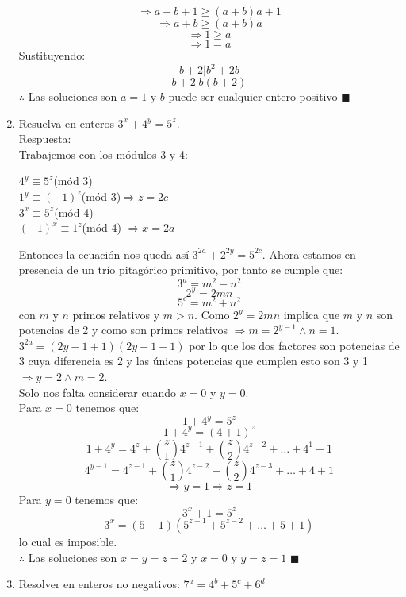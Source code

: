 \documentclass{book}
\begin{document}
\begin{enumerate}
        $$\Rightarrow a + b + 1 \geq (a + b)a + 1$$
        $$\Rightarrow a + b \geq (a + b)a$$
        $$\Rightarrow 1 \geq a$$
        $$\Rightarrow 1 = a $$
        Sustituyendo:
        $$b + 2| b^2 + 2b$$
        $$ b + 2 |b(b + 2)$$
        $\therefore$ Las soluciones son $a = 1$ y $b$ puede ser cualquier entero positivo $\blacksquare$\\
        \item Resuelva en enteros $3^x+4^y=5^z$.\\
        Respuesta:\\
        Trabajemos con los módulos 3 y 4:
        \begin{center}
            $4^y \equiv 5^z$(mód 3) \\
            $1^y \equiv (-1)^z$(mód 3)$ \Rightarrow z= 2c$\\
            $ 3^x \equiv 5^z$(mód 4)\\
            $ (-1)^x \equiv 1^z$(mód 4) $\Rightarrow x= 2a$\\
        \end{center}
        Entonces la ecuación nos queda así $3^{2a} + 2^{2y} = 5^{2c} $. Ahora estamos en presencia de un trío pitagórico primitivo, por tanto se cumple que:
        $$3^a = m^2 - n^2$$
        $$2^y = 2mn$$
        $$5^c = m^2 + n^2$$
        con $m$ y $n$ primos relativos y $m > n$.
        Como $2^y = 2mn$ implica que $m$ y $n$ son potencias de 2 y como son primos relativos $\Rightarrow m= 2^{y-1} \wedge n= 1$. \\
        $3^{2a} = (2y-1 + 1)(2y-1 - 1)$ por lo que los dos factores son potencias de 3 cuya diferencia es 2 y las únicas potencias que cumplen esto son 3 y 1 $\Rightarrow y= 2\wedge m= 2$.\\
        Solo nos falta considerar cuando $x=0$ y $y=0$.\\
        Para $x=0$ tenemos que:
        $$1+4^y=5^z$$
        $$1+4^y={(4+1)}^z$$
        $$1+4^y=4^z+{z\choose 1}4^{z-1}+ {z\choose 2}4^{z-2}+\ldots+4^1+1$$
        $$4^{y-1}=4^{z-1}+{z\choose 1}4^{z-2}+ {z\choose 2}4^{z-3}+\ldots+4+1$$
        $$\Rightarrow y=1\Rightarrow z=1$$
        Para $y=0$ tenemos que:
        $$3^x+1=5^z$$
        $$3^x=(5-1)(5^{z-1}+5^{z-2}+\ldots+5+1)$$
        lo cual es imposible.\\
        $\therefore$ Las soluciones son $x=y=z=2$ y $x=0$ y $y=z= 1$ $\blacksquare$ \\
        \item Resolver en enteros no negativos: $7^a=4^b+5^c+6^d$\\

\end{enumerate}
\end{document}
